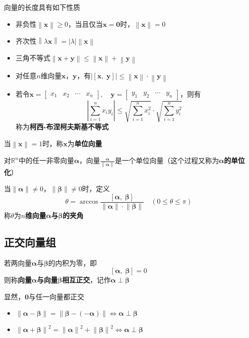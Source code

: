 \documentclass[UTF8]{ctexart}
\newcommand{\dotprod}[2]{\left[{#1},\;{#2}\right]}
\newcommand{\ve}[1]{{\bm{#1}}}
\newcommand{\mat}[1]{\ve{#1}}
\newcommand{\set}[1]{{\mathbb{#1}}}
\newcommand{\abs}[1]{{\left|{#1}\right|}}
\newcommand{\norm}[1]{{\left\|#1\right\|}}
\newcommand{\emplin}{\vspace{1em}}
\begin{document}
向量的长度具有如下性质
\begin{itemize}
  \item 非负性$\norm{\mat{x}}\ge0$，当且仅当$\mat{x}=\mat{0}$时，$\norm{\mat{x}}=0$
  \item 齐次性$\norm{\lambda\mat{x}}=\abs{\lambda}\norm{\mat{x}}$
  \item 三角不等式$\norm{\mat{x}+\mat{y}}\le\norm{\mat{x}}+\norm{\mat{y}}$
  \item 对任意$n$维向量$\mat{x}$，$\mat{y}$，有$\abs{\dotprod{\mat{x}}{\mat{y}}}\le\norm{\mat{x}}\cdot\norm{\mat{y}}$
  \item 若令$\mat{x}=\begin{bmatrix}x_1&x_2&\cdots&x_n\end{bmatrix},\quad\mat{y}=\begin{bmatrix}y_1&y_2&\cdots&y_n\end{bmatrix}$，则有
  \[\abs{\sum_{i=1}^nx_iy_i}\le\sqrt{\sum_{i=1}^nx_i^2}\cdot\sqrt{\sum_{i=1}^ny_i^2}\]
  称为\textbf{柯西-布涅柯夫斯基不等式}
\end{itemize}

\emplin
\emplin
\emplin

当$\norm{\mat{x}}=1$时，称$\mat{x}$为\textbf{单位向量}

对$\set{R}^n$中的任一非零向量$\mat{\alpha}$，向量$\frac{\mat{\alpha}}{\norm{\mat{\alpha}}}$是一个单位向量（这个过程又称为\textbf{$\mat{\alpha}$的单位化}）

当$\norm{\mat{\alpha}}\ne0$，$\norm{\mat{\beta}}\ne0$时，定义
\[\theta=\arccos\frac{\dotprod{\mat{\alpha}}{\mat{\beta}}}{\norm{\mat{\alpha}}\cdot\norm{\mat{\beta}}}\quad(0\le\theta\le\pi)\]
称$\theta$为\textbf{$n$维向量$\mat{\alpha}$与$\mat{\beta}$的夹角}

\subsection*{正交向量组}
若两向量$\mat{\alpha}$与$\mat{\beta}$的内积为零，即
\[\dotprod{\mat{\alpha}}{\mat{\beta}}=0\]
则称\textbf{向量$\mat{\alpha}$与向量$\mat{\beta}$相互正交}，记作$\mat{\alpha}\perp\mat{\beta}$

显然，$\mat{0}$与任一向量都正交

\begin{itemize}
  \item $\norm{\mat{\alpha}-\mat{\beta}}=\norm{\mat{\beta}-(-\mat{\alpha})}\iff\mat{\alpha}\perp\mat{\beta}$
  \item $\norm{\mat{\alpha}+\mat{\beta}}^2=\norm{\mat{\alpha}}^2+\norm{\mat{\beta}}^2\iff\mat{\alpha}\perp\mat{\beta}$
\end{itemize}
\end{document}
